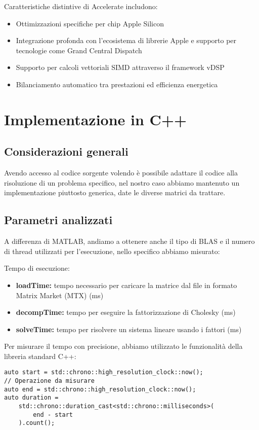Caratteristiche distintive di Accelerate includono:

\begin{itemize}
    \item Ottimizzazioni specifiche per chip Apple Silicon
    \item Integrazione profonda con l'ecosistema di librerie Apple e supporto per tecnologie come Grand Central Dispatch
    \item Supporto per calcoli vettoriali SIMD attraverso il framework vDSP
    \item Bilanciamento automatico tra prestazioni ed efficienza energetica
\end{itemize}

\section{Implementazione in C++}

\subsection{Considerazioni generali} 

Avendo accesso al codice sorgente volendo è possibile adattare il codice alla risoluzione di un problema specifico,
nel nostro caso abbiamo mantenuto un implementazione piuttosto generica, date le diverse matrici da trattare.

\subsection{Parametri analizzati} 

A differenza di MATLAB, andiamo a ottenere anche il tipo di BLAS e il numero di thread utilizzati per l'esecuzione,
nello specifico abbiamo misurato:

Tempo di esecuzione:
\begin{itemize}
    \item \textbf{loadTime:} tempo necessario per caricare la matrice dal file in formato Matrix Market (MTX) (ms)
    \item \textbf{decompTime:} tempo per eseguire la fattorizzazione di Cholesky (ms)
    \item \textbf{solveTime:} tempo per risolvere un sistema lineare usando i fattori (ms)
\end{itemize}

Per misurare il tempo con precisione, abbiamo utilizzato le funzionalità della libreria standard C++:
\begin{verbatim}
auto start = std::chrono::high_resolution_clock::now();
// Operazione da misurare
auto end = std::chrono::high_resolution_clock::now();
auto duration =
    std::chrono::duration_cast<std::chrono::milliseconds>(
        end - start
    ).count();
\end{verbatim}

